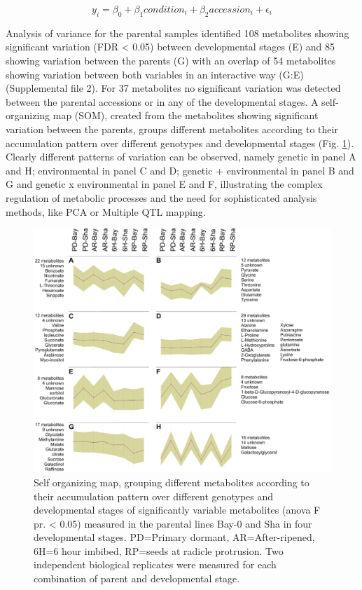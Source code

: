 $$ y_{i}   =   \beta_{0} + \beta_{1}condition_{i} + \beta_{2}accession_{i} + \epsilon_{i} $$

Analysis of variance for the parental samples identified 108 metabolites showing significant variation (FDR < 0.05) between 
developmental stages (E) and 85 showing variation between the parents (G) with an overlap of 54 metabolites showing variation 
between both variables in an interactive way (G:E) (Supplemental file 2). For 37 metabolites no significant variation was 
detected between the parental accessions or in any of the developmental stages. A self-organizing map (SOM), created from the 
metabolites showing significant variation between the parents, groups different metabolites according to their accumulation 
pattern over different genotypes and developmental stages (Fig. \ref{fig:SOM}). Clearly different patterns of variation can be observed, 
namely genetic in panel A and H; environmental in panel C and D; genetic + environmental in panel B and G and genetic x 
environmental in panel E and F, illustrating the complex regulation of metabolic processes and the need for sophisticated 
analysis methods, like PCA or Multiple QTL mapping\cite{Arends:2010}. 

\begin{figure}[!ht]
  \centering
  \includegraphics[keepaspectratio,scale=0.30]{eps/image_3_2_1.eps}
  \caption[Self organizing map]{Self organizing map, grouping different metabolites according to their accumulation pattern over different 
    genotypes and developmental stages of significantly variable metabolites (anova F pr. < 0.05)  measured in the parental lines Bay-0 
    and Sha in four developmental stages.  PD=Primary dormant, AR=After-ripened, 6H=6 hour imbibed, RP=seeds at radicle protrusion. Two
    independent biological replicates were measured for each combination of parent and developmental stage.}
    \label{fig:SOM}
\end{figure}


